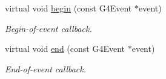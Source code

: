 \begin{DoxyCompactItemize}
virtual void \hyperlink{class_d_d4hep_1_1_simulation_1_1_geant4_event_action_sequence_a77375888d2519a2095ded294c540ebec}{begin} (const G4Event $\ast$event)
\begin{DoxyCompactList}\small\item\em Begin-\/of-\/event callback. \item\end{DoxyCompactList}\item 
virtual void \hyperlink{class_d_d4hep_1_1_simulation_1_1_geant4_event_action_sequence_a5815e04637704ceddb2abd2677e1522b}{end} (const G4Event $\ast$event)
\begin{DoxyCompactList}\small\item\em End-\/of-\/event callback. \item\end{DoxyCompactList}\end{DoxyCompactItemize}
